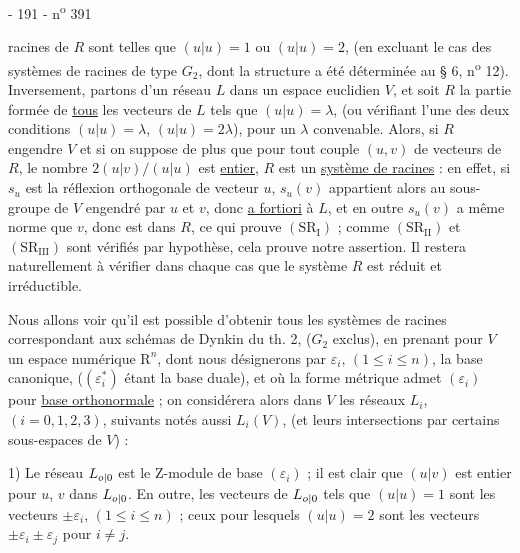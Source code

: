 - 191 - \hfill n\textsuperscript{o} 391

racines de $R$ sont telles que $(u|u)=1$ ou $(u|u)=2$, (en excluant le cas des systèmes de racines de type $G_2$, dont la structure a été déterminée au § 6, n\textsuperscript{o} 12). Inversement, partons d'un réseau $L$ dans un espace euclidien $V$, et soit $R$ la partie formée de \uline{tous} les vecteurs de $L$ tels que $(u|u)=\lambda$, (ou vérifiant l'une des deux conditions $(u|u)=\lambda$, $(u|u)=2\lambda$), pour un $\lambda$ convenable. Alors, si $R$ engendre $V$ et si on suppose de plus que pour tout couple $(u,v)$ de vecteurs de $R$, le nombre $2(u|v)/(u|u)$ est \uline{entier}, $R$ est un \uline{système de racines} : en effet, si $s_u$ est la réflexion orthogonale de vecteur $u$, $s_u(v)$ appartient alors au sous-groupe de $V$ engendré par $u$ et $v$, donc \uline{a fortiori} à $L$, et en outre $s_u(v)$ a même norme que $v$, donc est dans $R$, ce qui prouve $(\mathrm{SR}_{\mathrm I})$ ; comme $(\mathrm{SR}_{\mathrm{II}})$ et $(\mathrm{SR}_{\mathrm{III}})$ sont vérifiés par hypothèse, cela prouve notre assertion. Il restera naturellement à vérifier dans chaque cas que le système $R$ est réduit et irréductible.

Nous allons voir qu'il est possible d'obtenir tous les systèmes de racines correspondant aux schémas de Dynkin du th. 2, ($G_2$ exclus), en prenant pour $V$ un espace numérique $\mathrm R^n$, dont nous désignerons par $\varepsilon_i$, $(1\leq i\leq n)$, la base canonique, ($(\varepsilon_i^*)$ étant la base duale), et où la forme métrique admet $(\varepsilon_i)$ pour \uline{base orthonormale} ; on considérera alors dans $V$ les réseaux $L_i$, $(i=0,1,2,3)$, suivants notés aussi $L_i(V)$, (et leurs intersections par certains sous-espaces de $V$) :

1) Le réseau $L_{\relax{o|0}}$ est le $\mathrm Z$-module de base $(\varepsilon_i)$ ; il est clair que $(u|v)$ est entier pour $u$, $v$ dans $L_{\relax{o|0}}$. En outre, les vecteurs de $L_{\relax{o|0}}$ tels que $(u|u)=1$ sont les vecteurs $\pm\varepsilon_i$, $(1\leq i\leq n)$ ; ceux pour lesquels $(u|u)=2$ sont les vecteurs $\pm\varepsilon_i\pm\varepsilon_j$ pour $i\neq j$.
